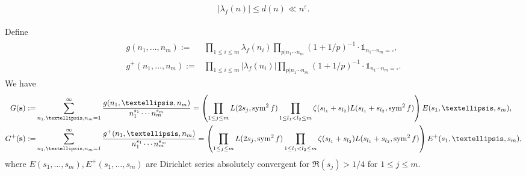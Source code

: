 \documentclass[10pt,a4paper]{amsart}
\begin{document}
\begin{align}
\label{lambdabound}
\begin{split}
  |\lambda_f(n)| \leq d(n) \ll n^{\varepsilon}.
\end{split}
\end{align}

\begin{lemma}\label{Dirichletseries}
  Define
  \begin{align}
  \label{f}
  \begin{split}
g(n_1, \ldots, n_{m}):= & \prod_{1\leq i\leq m}\lambda_f(n_i)\prod_{p|n_1\cdots n_m}(1+1/p)^{-1}\cdot \mathds{1}_{n_1\cdots n_m=\square}, \\
g^+(n_1, \ldots, n_{m}):= & \prod_{1\leq i\leq m}|\lambda_f(n_i)|\prod_{p|n_1\cdots n_m}(1+1/p)^{-1}\cdot \mathds{1}_{n_1\cdots n_m=\square}.
\end{split}
  \end{align}
We have
\begin{align}
 \label{Gdef}
  \begin{split}
G({\bf s}):=& \sum_{n_1, \ldots, n_{m}=1}^{\infty} \frac{g(n_1, \ldots, n_{m})}{n_1^{s_1} \cdots n_m^{s_{m}}} =  \left( \prod_{1 \leq j \leq m} L(2s_j, \operatorname{sym}^2f ) \prod_{1 \leq l_1 < l_2 \leq m} \zeta(s_{l_1} + s_{l_2})L (s_{l_1} + s_{l_2},\operatorname{sym}^2f)\right) E(s_1, \ldots, s_{m}), \\
 G^+({\bf s}):=& \sum_{n_1, \ldots, n_{m}=1}^{\infty} \frac{g^+(n_1, \ldots, n_{m})}{n_1^{s_1} \cdots n_m^{s_{m}}} =  \left( \prod_{1 \leq j \leq m} L(2s_j, \operatorname{sym}^2f ) \prod_{1 \leq l_1 < l_2 \leq m} \zeta(s_{l_1} + s_{l_2})L (s_{l_1} + s_{l_2},\operatorname{sym}^2f)\right) E^+(s_1, \ldots, s_{m}),
\end{split}
\end{align}
where \( E(s_1, \ldots, s_{m}), E^+(s_1, \ldots, s_{m})  \) are Dirichlet series absolutely convergent for \( \Re(s_j) > 1/4 \) for \( 1 \leq j \leq m \).
\end{lemma}
\end{document}
